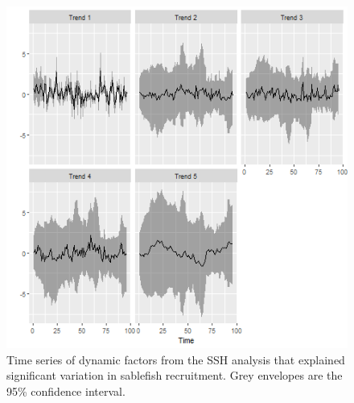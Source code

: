 \documentclass[11pt,
  english,
  a4paper,
]{article}
\begin{document}
\tagmcend\tagstructend


\begin{figure}
\centering
\includegraphics[width=1\textwidth,height=1\textheight]{figs/DF5_Trends.png}
\caption{Time series of dynamic factors from the SSH analysis that explained significant variation in sablefish recruitment. Grey envelopes are the 95\% confidence interval. \label{fig:ssh-df}}
\end{figure}

\tagmcend\tagstructend

\end{document}
